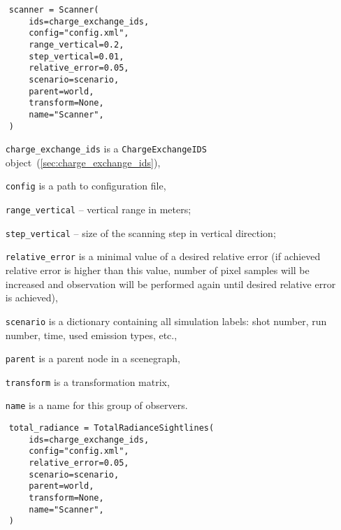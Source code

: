 \documentclass[../main.tex]{subfiles}
\begin{document}
\begin{verbatim}
    scanner = Scanner(
        ids=charge_exchange_ids,
        config="config.xml",
        range_vertical=0.2,
        step_vertical=0.01,
        relative_error=0.05,
        scenario=scenario,
        parent=world,
        transform=None,
        name="Scanner",
    )
\end{verbatim}

\begin{itemize}[align=left]
    \item[\texttt{charge\_exchange\_ids}] is a \texttt{ChargeExchangeIDS} object~(\cref{sec:charge_exchange_ids}),
    \item[\texttt{config}] is a path to configuration file,
    \item[\texttt{range\_vertical}] -- vertical range in meters;
    \item[\texttt{step\_vertical}] -- size of the scanning step in vertical direction;
    \item[\texttt{relative\_error}] is a minimal value of a desired relative error (if achieved relative error is higher than this value, number of pixel samples will be increased and observation will be performed again until desired relative error is achieved),
    \item[\texttt{scenario}] is a dictionary containing all simulation labels: shot number, run number, time, used emission types, etc.,
    \item[\texttt{parent}] is a parent node in a scenegraph,
    \item[\texttt{transform}] is a transformation matrix,
    \item[\texttt{name}] is a name for this group of observers.
\end{itemize}

\begin{verbatim}
    total_radiance = TotalRadianceSightlines(
        ids=charge_exchange_ids,
        config="config.xml",
        relative_error=0.05,
        scenario=scenario,
        parent=world,
        transform=None,
        name="Scanner",
    )
\end{verbatim}
\end{document}
